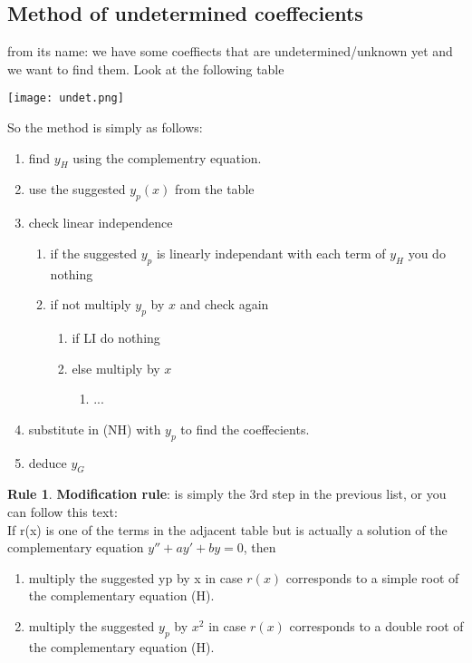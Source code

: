 \documentclass[11pt]{article}
\theoremstyle{definition}
\newtheorem{reg}{Rule}
\begin{document}
\subsection{Method of undetermined coeffecients}
from its name: we have some coeffiects that are undetermined/unknown yet and we want to find them. Look at the following table 
\begin{center}
    \texttt{[image: undet.png]}
\end{center}
So the method is simply as follows: 
\begin{enumerate}
    \item find $y_H$ using the complementry equation.
\item use the suggested $y_p(x)$ from the table
\item check linear independence 
\begin{enumerate}
    \item if the suggested $y_p$ is linearly independant with each term of $y_H$ you do nothing
    \item if not multiply $y_p$ by $x$ and check again
    \begin{enumerate}
        \item if LI do nothing
        \item else multiply by $x$
        \begin{enumerate}
            \item ...
        \end{enumerate}
    \end{enumerate}
\end{enumerate}
\item substitute in (NH) with $y_p$ to find the coeffecients.
\item deduce $y_G$
\end{enumerate}
\begin{reg}
\textbf{Modification rule}: is simply the 3rd step in the previous list, or you can follow this text: \\
If r(x) is one of the terms in the adjacent table but is actually a solution of the complementary equation $y'' + ay' + by = 0$, then \begin{enumerate}
    \item multiply the suggested yp by x in case $r(x)$ corresponds to a simple root of the complementary equation (H).
    \item multiply the suggested $y_p$ by $x^2$ in case $r(x)$ corresponds to a double root of the complementary equation (H).
\end{enumerate} 

\end{reg}
\end{document}
